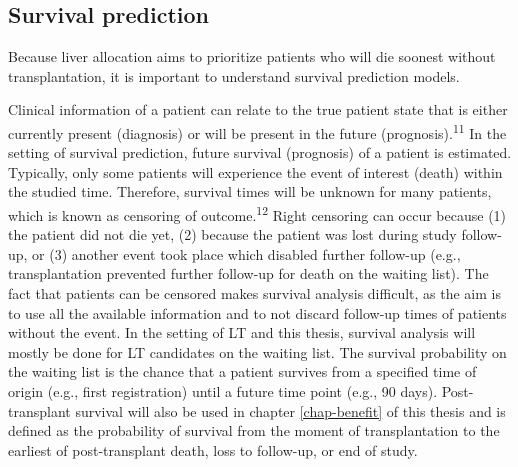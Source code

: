\documentclass[11pt,english,]{book} %
\begin{document}
\hypertarget{survival-prediction}{%
\subsection*{Survival prediction}\label{survival-prediction}}

Because liver allocation aims to prioritize patients who will die soonest without transplantation, it is important to understand survival prediction models.

Clinical information of a patient can relate to the true patient state that is either currently present (diagnosis) or will be present in the future (prognosis).\textsuperscript{11} In the setting of survival prediction, future survival (prognosis) of a patient is estimated. Typically, only some patients will experience the event of interest (death) within the studied time. Therefore, survival times will be unknown for many patients, which is known as censoring of outcome.\textsuperscript{12} Right censoring can occur because (1) the patient did not die yet, (2) because the patient was lost during study follow-up, or (3) another event took place which disabled further follow-up (e.g., transplantation prevented further follow-up for death on the waiting list). The fact that patients can be censored makes survival analysis difficult, as the aim is to use all the available information and to not discard follow-up times of patients without the event. In the setting of LT and this thesis, survival analysis will mostly be done for LT candidates on the waiting list. The survival probability on the waiting list is the chance that a patient survives from a specified time of origin (e.g., first registration) until a future time point (e.g., 90 days). Post-transplant survival will also be used in chapter \ref{chap-benefit} of this thesis and is defined as the probability of survival from the moment of transplantation to the earliest of post-transplant death, loss to follow-up, or end of study.
\end{document}

